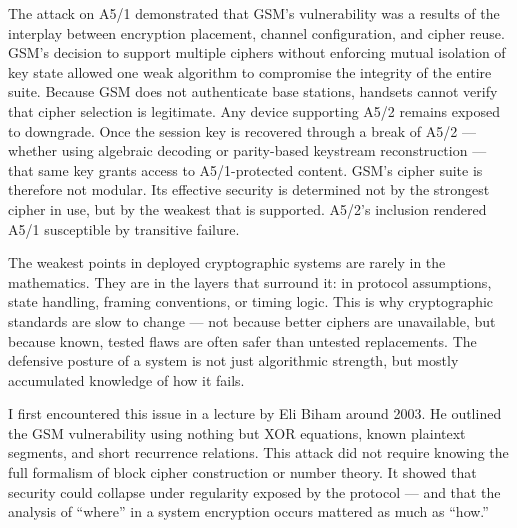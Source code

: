 The attack on A5/1 demonstrated that GSM’s vulnerability was a results of the interplay between encryption placement, channel configuration, and cipher reuse. GSM’s decision to support multiple ciphers without enforcing mutual isolation of key state allowed one weak algorithm to compromise the integrity of the entire suite. Because GSM does not authenticate base stations, handsets cannot verify that cipher selection is legitimate. Any device supporting A5/2 remains exposed to downgrade. Once the session key is recovered through a break of A5/2 — whether using algebraic decoding or parity-based keystream reconstruction — that same key grants access to A5/1-protected content. GSM’s cipher suite is therefore not modular. Its effective security is determined not by the strongest cipher in use, but by the weakest that is supported. A5/2’s inclusion rendered A5/1 susceptible by transitive failure.
\newpage
\begin{commentary}

The weakest points in deployed cryptographic systems are rarely in the mathematics. They are in the layers that surround it: in protocol assumptions, state handling, framing conventions, or timing logic. This is why cryptographic standards are slow to change — not because better ciphers are unavailable, but because known, tested flaws are often safer than untested replacements. The defensive posture of a system is not just algorithmic strength, but mostly accumulated knowledge of how it fails.

I first encountered this issue in a lecture by Eli Biham around 2003. He outlined the GSM vulnerability using nothing but XOR equations, known plaintext segments, and short recurrence relations. This attack did not require knowing the full formalism of block cipher construction or number theory. It showed that security could collapse under regularity exposed by the protocol — and that the analysis of “where” in a system encryption occurs mattered as much as “how.”

\end{commentary}

